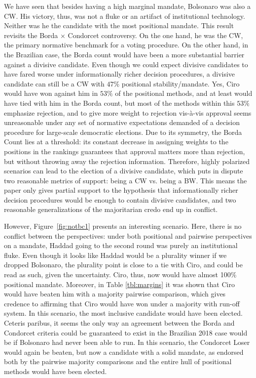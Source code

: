 \documentclass[hidelinks,11pt]{article}
\begin{document}
    We have seen that besides having a high marginal mandate, Bolsonaro was also
    a CW. His victory, thus, was not a fluke or an artifact of institutional
    technology. Neither was he the candidate with the most positional mandate.
    This result revisits the Borda \(\times\) Condorcet controversy. On the one
    hand, he was the CW, the primary normative benchmark for a voting procedure.
    On the other hand, in the Brazilian case, the Borda count would have been a
    more substantial barrier against a divisive candidate. Even though we could
    expect divisive candidates to have fared worse under informationally richer
    decision procedures, a divisive candidate can still be a CW with \(47\%\)
    positional stability/mandate. Yes, Ciro would have won against him in
    \(53\%\) of the positional methods, and at least would have tied with him in
    the Borda count, but most of the methods within this \(53\%\) emphasize
    rejection, and to give more weight to rejection vis-\`a-vis approval seems
    unreasonable under any set of normative expectations demanded of a decision
    procedure for large-scale democratic elections. Due to its symmetry, the
    Borda Count lies at a threshold: its constant decrease in assigning weights
    to the positions in the rankings guarantees that approval matters more than
    rejection, but without throwing away the rejection information. Therefore,
    highly polarized scenarios can lead to the election of a divisive candidate,
    which puts in dispute two reasonable metrics of support: being a CW vs.
    being a BW. This means the paper only gives partial support to the
    hypothesis that informationally richer decision procedures would be enough
    to contain divisive candidates, and two reasonable generalizations of the
    majoritarian credo end up in conflict.

    However, Figure~\ref{fig:notbc1} presents an interesting scenario. Here,
there is no conflict between the perspectives: under both positional and
pairwise perspectives on a mandate, Haddad going to the second round was purely
an institutional fluke. Even though it looks like Haddad would be a plurality
winner if we dropped Bolsonaro, the plurality point is close to a tie with Ciro,
and could be read as such, given the uncertainty. Ciro, thus, now would have
almost 100\(\%\) positional mandate. Moreover, in Table \ref{tbl:margins} it was
shown that Ciro would have beaten him with a majority pairwise comparison, which
gives credence to affirming that Ciro would have won under a majority with
run-off system. In this scenario, the most inclusive candidate would have been
elected. Ceteris paribus, it seems the only way an agreement between the
Borda and Condorcet criteria could be guaranteed to exist in the Brazilian 2018
case would be if Bolsonaro had never been able to run. In this scenario, the
Condorcet Loser would again be beaten, but now a candidate with a solid mandate,
as endorsed both by the pairwise majority comparisons and the entire hull of
positional methods would have been elected.
\end{document}
